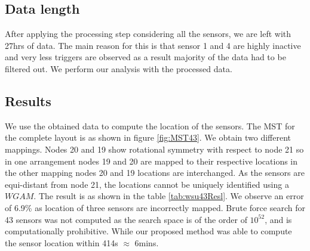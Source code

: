 \subsection{Data length}
After applying the processing step considering all the sensors, we are left with 27hrs of data. The main reason for this is that sensor 1 and 4 are highly inactive and very less triggers are observed as a result majority of the data had to be filtered out. We perform our analysis with the processed data.


\subsection{Results}

We use the obtained data to compute the location of the sensors. The MST for the complete layout is as shown in figure \ref{fig:MST43}. We obtain two different mappings. 
Nodes 20 and 19 show rotational symmetry with respect to node 21 so in one arrangement nodes 19 and 20 are mapped to their respective locations in the other mapping nodes 20 and 19 locations are interchanged. As the sensors are equi-distant from node 21, the locations cannot be uniquely identified using a $WGAM$. 
The result is as shown in the table \ref{tab:wsu43Resl}. We observe an error of 6.9\% as location of three sensors are incorrectly mapped.
Brute force search for 43 sensors was not computed as the search space is of the order of $10^{52}$, and is computationally prohibitive.
While our proposed method was able to compute the sensor location within 414s $\approx$ 6mins. 
  
  

